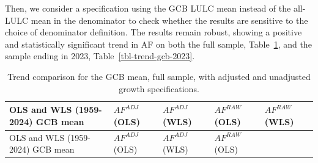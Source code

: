 \documentclass[
  12pt,
  letterpaper,
  DIV=11,
  numbers=noendperiod]{scrartcl}
\begin{document}
Then, we consider a specification using the GCB LULC mean instead of the
all-LULC mean in the denominator to check whether the results are
sensitive to the choice of denominator definition. The results remain
robust, showing a positive and statistically significant trend in AF on
both the full sample, Table~\ref{tbl-trend-gcb}, and the sample ending
in 2023, Table~\ref{tbl-trend-gcb-2023}.

\begin{longtable}[]{@{}
  >{\raggedright\arraybackslash}p{}
  >{\raggedleft\arraybackslash}p{}
  >{\raggedleft\arraybackslash}p{}
  >{\raggedleft\arraybackslash}p{}
  >{\raggedleft\arraybackslash}p{}@{}}
\caption{Trend comparison for the GCB mean, full sample, with adjusted
and unadjusted growth
specifications.}\label{tbl-trend-gcb}\tabularnewline
\toprule\noalign{}
\begin{minipage}[b]{\linewidth}\raggedright
OLS and WLS (1959-2024) GCB mean
\end{minipage} & \begin{minipage}[b]{\linewidth}\raggedleft
\(AF^{ADJ}\) (OLS)
\end{minipage} & \begin{minipage}[b]{\linewidth}\raggedleft
\(AF^{ADJ}\) (WLS)
\end{minipage} & \begin{minipage}[b]{\linewidth}\raggedleft
\(AF^{RAW}\) (OLS)
\end{minipage} & \begin{minipage}[b]{\linewidth}\raggedleft
\(AF^{RAW}\) (WLS)
\end{minipage} \\
\midrule\noalign{}
\endfirsthead
\toprule\noalign{}
\begin{minipage}[b]{\linewidth}\raggedright
OLS and WLS (1959-2024) GCB mean
\end{minipage} & \begin{minipage}[b]{\linewidth}\raggedleft
\(AF^{ADJ}\) (OLS)
\end{minipage} & \begin{minipage}[b]{\linewidth}\raggedleft
\(AF^{ADJ}\) (WLS)
\end{minipage} & \begin{minipage}[b]{\linewidth}\raggedleft
\(AF^{RAW}\) (OLS)
\end{minipage} & \begin{minipage}[b]{\linewidth}\raggedleft

\end{minipage}
\end{longtable}
\end{document}
